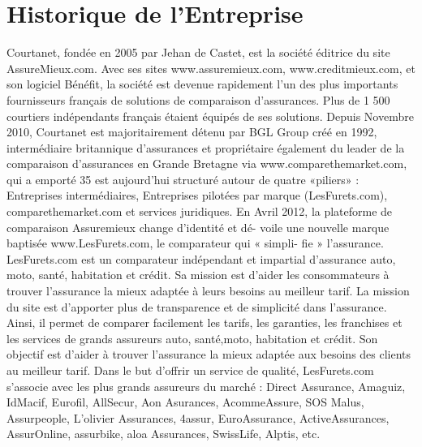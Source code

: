 \section{Historique de l'Entreprise}
Courtanet, fondée en 2005 par Jehan de Castet, est la société éditrice du site AssureMieux.com.
Avec ses sites www.assuremieux.com, www.creditmieux.com, et son logiciel
Bénéfit, la société est devenue rapidement l’un des plus importants fournisseurs
français de solutions de comparaison d’assurances. Plus de 1 500 courtiers indépendants
français étaient équipés de ses solutions. Depuis Novembre 2010, Courtanet est majoritairement
détenu par BGL Group créé en 1992, intermédiaire britannique d’assurances et
propriétaire également du leader de la comparaison d’assurances en Grande Bretagne via
www.comparethemarket.com, qui a emporté 35%
est aujourd’hui structuré autour de quatre «piliers» : Entreprises intermédiaires, Entreprises
pilotées par marque (LesFurets.com), comparethemarket.com et services juridiques.
En Avril 2012, la plateforme de comparaison Assuremieux change d’identité et dé-
voile une nouvelle marque baptisée www.LesFurets.com, le comparateur qui « simpli-
fie » l’assurance. LesFurets.com est un comparateur indépendant et impartial d’assurance
auto, moto, santé, habitation et crédit. Sa mission est d’aider les consommateurs
à trouver l’assurance la mieux adaptée à leurs besoins au meilleur tarif. La mission
du site est d’apporter plus de transparence et de simplicité dans l’assurance. Ainsi,
il permet de comparer facilement les tarifs, les garanties, les franchises et les services
de grands assureurs auto, santé,moto, habitation et crédit. Son objectif est d’aider à
trouver l’assurance la mieux adaptée aux besoins des clients au meilleur tarif. Dans
le but d’offrir un service de qualité, LesFurets.com s’associe avec les plus grands assureurs
du marché : Direct Assurance, Amaguiz, IdMacif, Eurofil, AllSecur, Aon Asurances,
AcommeAssure, SOS Malus, Assurpeople, L’olivier Assurances, 4assur, EuroAssurance,
ActiveAssurances, AssurOnline, assurbike, aloa Assurances, SwissLife, Alptis, etc.